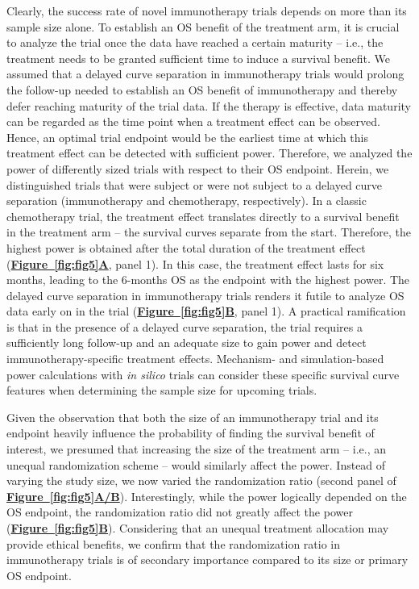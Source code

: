 \documentclass[a4paper,10pt]{article}
\newcommand{\myref}[2]{\hyperref[#1]{\bfseries Figure~\ref*{#1}#2}}
\begin{document}
Clearly, the success rate of novel immunotherapy trials depends on more than
its sample size alone. To establish an OS benefit of the treatment arm, it is
crucial to analyze the trial once the data have reached a certain maturity --
i.e., the treatment needs to be granted sufficient time to induce a survival
benefit. We assumed that a delayed curve separation in immunotherapy trials
would prolong the follow-up needed to establish an OS benefit of immunotherapy
and thereby defer reaching maturity of the trial data. If the therapy is
effective, data maturity can be regarded as the time point when a treatment
effect can be observed. Hence, an optimal trial endpoint would be the earliest
time at which this treatment effect can be detected with sufficient power.
Therefore, we analyzed the power of differently sized trials with respect to
their OS endpoint. Herein, we distinguished trials that were subject or were
not subject to a delayed curve separation (immunotherapy and chemotherapy,
respectively). In a classic chemotherapy trial, the treatment effect translates
directly to a survival benefit in the treatment arm -- the survival curves
separate from the start. Therefore, the highest power is obtained after
the total duration of the treatment effect (\myref{fig:fig5}{A}, panel 1). In this case,
the treatment effect lasts for six months, leading to the 6-months OS as the
endpoint with the highest power. The delayed curve separation in immunotherapy
trials renders it futile to analyze OS data early on in the trial (\myref{fig:fig5}{B},
panel 1). A practical ramification is that in the presence of a delayed curve
separation, the trial requires a sufficiently long follow-up and an adequate
size to gain power and detect immunotherapy-specific treatment effects.
Mechanism- and simulation-based power calculations with \emph{in silico} trials can
consider these specific survival curve features when determining the sample size for upcoming
trials. 

Given the observation that both the size of an immunotherapy trial and its
endpoint heavily influence the probability of finding the survival benefit of
interest, we presumed that increasing the size of the treatment arm -- i.e., an
unequal randomization scheme -- would similarly affect the power. Instead of
varying the study size, we now varied the randomization ratio (second panel of
\myref{fig:fig5}{A/B}). Interestingly, while the power logically depended on the OS
endpoint, the randomization ratio did not greatly affect the power (\myref{fig:fig5}{B}).
Considering that an unequal treatment allocation may provide ethical benefits,
we confirm that the randomization ratio in immunotherapy trials is of secondary
importance compared to its size or primary OS endpoint. 
\end{document}
